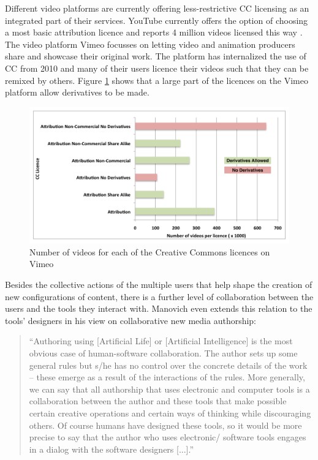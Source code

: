 Different video platforms are currently offering less-restrictive CC licensing as an integrated part of their services. YouTube currently offers the option of choosing a most basic attribution licence and reports 4 million videos licensed this way \cite{YouTubeCC}. The video platform Vimeo focusses on letting video and animation producers share and showcase their original work. The platform has internalized the use of CC from 2010\cite{vimeoTimeline} and many of their users licence their videos such that they can be remixed by others. Figure \ref{fig:vimeoCC} shows that a large part of the licences on the Vimeo platform allow derivatives to be made\cite{vimeoCC}.

\begin{figure}[htbp]
  \centering
    \includegraphics[scale=1]{img/vimeoCC}
  \caption{Number of videos for each of the Creative Commons licences on Vimeo}
  \label{fig:vimeoCC}
\end{figure}

Besides the collective actions of the multiple users that help shape the creation of new configurations of content, there is a further level of collaboration between the users and the tools they interact with. Manovich even extends this relation to the tools' designers in his view on collaborative new media authorship:

\begin{quote}
  ``Authoring using [Artificial Life] or [Artificial Intelligence] is the most obvious case of human-software collaboration. The author sets up some general rules but s/he has no control over the concrete details of the work – these emerge as a result of the interactions of the rules. More generally, we can say that all authorship that uses electronic and computer tools is a collaboration between the author and these tools that make possible certain creative operations and certain ways of thinking while discouraging others. Of course humans have designed these tools, so it would be more precise to say that the author who uses electronic/ software tools engages in a dialog with the software designers [...].''\cite{manovichAuthor}
\end{quote}


